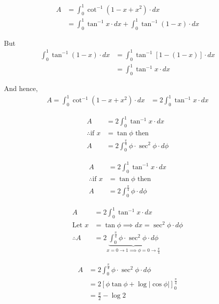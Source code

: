 \documentclass[14pt,fleqn]{extarticle}
\begin{document}
\newcard 

\begin{align}
A &= \int_0^1 \cot^{-1}(1-x+x^2)\cdot dx \\
&= \int_0^1\tan^{-1}x\cdot dx +\int_0^1 \tan^{-1}\left( 1-x \right)\cdot dx
\end{align}

But 
\begin{align}
	\int_0^1\tan^{-1} \left(1-x \right)\cdot dx &= \int_0^1\tan^{-1} \left[1-(1-x) \right]\cdot dx \\
	&= \int_0^1 \tan^{-1} x\cdot dx
\end{align}

And hence, 
\begin{align}
A = \int_0^1 \cot^{-1}(1-x+x^2)\cdot dx &= 2\int_0^1\tan^{-1} x\cdot dx 
\end{align}


\newcard 

\begin{align}
A &= 2\int_0^1 \tan^{-1} x\cdot dx  \\
\therefore \text{if }x &= \tan \phi\text{ then }  \\
A &= 2\int_0^{\frac\pi{4}}\phi\cdot\sec^2\phi\cdot d\phi
\end{align}

\newcard 

\begin{align}
A &= 2\int_0^1 \tan^{-1} x\cdot dx  \\
\therefore \text{if }x &= \tan \phi\text{ then }  \\
A &= 2\int_0^{\frac\pi{4}}\phi\cdot d\phi
\end{align}

\newcard 

\begin{align}
A &= 2\int_0^1\tan^{-1}x\cdot dx \\
\text{Let }x &= \tan\phi \implies dx = \sec^2\phi\cdot d\phi \\
\therefore A &= 2\underbrace{\int_0^{\frac\pi{4}}\phi\cdot\sec^2\phi\cdot d\phi}
_{x = 0\rightarrow 1\implies \phi = 0\rightarrow\frac\pi{4} }
\end{align}

\newcard 

\begin{align}
A &= 2\int_0^{\frac\pi{4}}\phi\cdot\sec^2\phi\cdot d\phi \\
&= 2\left[ \phi\tan\phi + \log \vert \cos \phi \vert \right]_0^{\frac\pi{4}} \\
&= \frac\pi{2} - \log 2 
\end{align}
\end{document}
